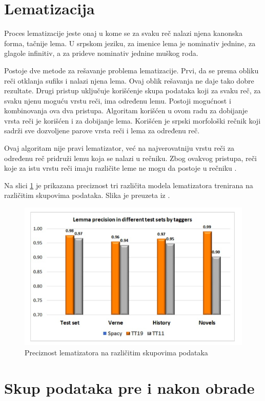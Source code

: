 \documentclass[12pt,oneside]{memoir}
\begin{document}
\section{Lematizacija}

Proces lematizacije jeste onaj u kome se za svaku reč nalazi njena kanonska forma, tačnije lema. U srpskom jeziku, za imenice lema je nominativ jednine,  za glagole infinitiv, a za prideve nominativ jednine muškog roda. 

Postoje dve metode za rešavanje problema lematizacije.  Prvi, da se prema obliku reči otklanja sufiks i nalazi njena lema. Ovaj oblik rešavanja ne daje tako dobre rezultate.  Drugi pristup uključuje korišćenje skupa podataka koji za svaku reč, za svaku njenu moguću vrstu reči, ima određenu lemu. Postoji mogućnost i kombinovanja ova dva pristupa. 
\newpage
\noindent
Algoritam korišćen u ovom radu za dobijanje vrsta reči je korišćen i za dobijanje lema. Korišćen je srpski morfološki rečnik koji sadrži sve dozvoljene parove vrsta reči i lema za određenu reč.

Ovaj algoritam nije pravi lematizator, već na najverovatniju vrstu reči za određenu reč pridruži lemu koja se nalazi u rečniku. Zbog ovakvog pristupa, reči koje za istu vrstu reči imaju različite leme ne mogu da postoje u rečniku \cite{tagger}.

Na slici \ref{img:lemmatization} je prikazana preciznost tri različita modela lematizatora trenirana na različitim skupovima podataka. Slika je preuzeta iz \cite{tagger}.

\begin{figure}[h!]
\centering
\includegraphics[width=.7\textwidth]{images/lemmatization.png}
\caption{Preciznost lematizatora na različitim skupovima podataka}
\label{img:lemmatization}
\end{figure}

\section{Skup podataka pre i nakon obrade}
\end{document}
